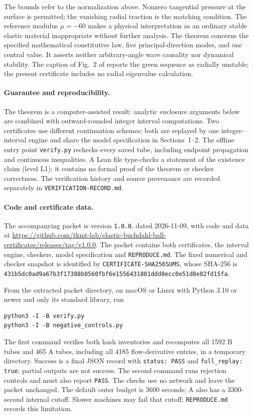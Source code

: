 \documentclass[11pt]{article}
\begin{document}
The bounds refer to the normalization above. Nonzero tangential pressure at the surface is permitted; the vanishing radial traction is the matching condition. The reference modulus $\mu=-60$ makes a physical interpretation as an ordinary stable elastic material inappropriate without further analysis. The theorem concerns the specified mathematical constitutive law, five principal-direction modes, and one central value. It asserts neither arbitrary-angle wave causality nor dynamical stability. The caption of Fig.~2 of \cite{ANPR22} reports the green sequence as radially unstable; the present certificate includes no radial eigenvalue calculation.

\paragraph{Guarantee and reproducibility.}
The theorem is a computer-assisted result: analytic enclosure arguments below are combined with outward-rounded integer interval computations. Two certificates use different continuation schemes; both are replayed by one integer-interval engine and share the model specification in Sections~1--2. The offline entry point \texttt{verify.py} rechecks every saved tube, including endpoint propagation and continuous inequalities. A Lean file type-checks a statement of the existence claim (level L1); it contains no formal proof of the theorem or checker correctness. The verification history and source provenance are recorded separately in \texttt{VERIFICATION-RECORD.md}.

\paragraph{Code and certificate data.}
The accompanying packet is version \texttt{1.0.0}, dated 2026-11-09, with code and data at
\url{https://github.com/tkmt-lab/elastic-buchdahl-ball-certificates/releases/tag/v1.0.0}.
The packet contains
both certificates, the interval engine, checkers, model specification
and \texttt{REPRODUCE.md}. The fixed numerical and checker snapshot
is identified by \texttt{CERTIFICATE-SHA256SUMS}, whose SHA-256 is
\nolinkurl{431b5dc0ad9a67b3f17388b0560fbf6e1556431801ddd0ecc0e51d0e82fd15fa}.
\begin{samepage}
From the extracted packet directory, on macOS or Linux with
Python 3.10 or newer and only its standard library, run
\begin{verbatim}
python3 -I -B verify.py
python3 -I -B negative_controls.py
\end{verbatim}
\end{samepage}
The first command verifies both hash inventories and recomputes all
1592 B tubes and 465 A tubes, including all 4185 flow-derivative
entries, in a temporary directory. Success is a final JSON record
with \texttt{status: PASS} and \texttt{full\_replay: true}; partial
outputs are not success. The second command runs rejection controls
and must also report \texttt{PASS}. The checks use no network and
leave the packet unchanged. The default outer budget is 3600 seconds;
A also has a 3300-second internal cutoff. Slower machines may fail
that cutoff; \texttt{REPRODUCE.md} records this limitation.
\end{document}
